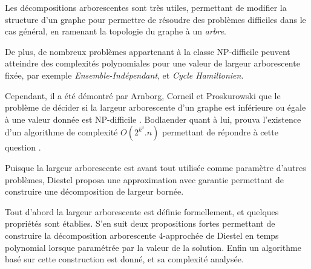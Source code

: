 

Les décompositions arborescentes sont très utiles, permettant
de modifier la structure d'un graphe pour permettre de résoudre
des problèmes difficiles dans le cas général, en ramenant la topologie
du graphe à un {\em arbre}.

De plus, de nombreux problèmes appartenant à la classe NP-difficile
peuvent atteindre des complexités polynomiales pour une valeur de
largeur arborescente fixée, par exemple {\em Ensemble-Indépendant},
et {\em Cycle Hamiltonien}.

Cependant, il a été démontré par Arnborg, Corneil et Proskurowski que le
problème de décider si la largeur arborescente d'un graphe est inférieure
ou égale à une valeur donnée est NP-difficile \cite{arnborg}.
Bodlaender quant à lui, prouva l'existence d'un 
algorithme de complexité $O(2^{k^3}.n)$ permettant de répondre
à cette question \cite{bodlaender}.

Puisque la largeur arborescente est avant tout utilisée comme
paramètre d'autres problèmes, Diestel \cite{diestel} proposa une approximation
avec garantie permettant de construire une décomposition de largeur
bornée.

Tout d'abord la largeur arborescente est définie formellement, et quelques propriétés
sont établies. S'en suit deux propositions fortes permettant de
construire la
décomposition arborescente $4$-approchée de Diestel
en temps polynomial lorsque paramétrée par
la valeur de la solution.
Enfin un algorithme basé sur cette construction est donné, et sa complexité analysée.


